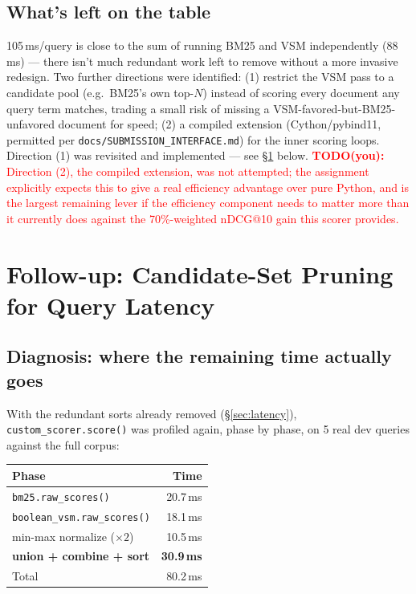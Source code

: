 \documentclass[11pt]{article}
\newcommand{\todo}[1]{\textcolor{red}{\textbf{TODO(you):} #1}}
\begin{document}
\subsection{What's left on the table}
105\,ms/query is close to the sum of running BM25 and VSM independently
(88\,ms) --- there isn't much redundant work left to remove without a
more invasive redesign. Two further directions were identified: (1)
restrict the VSM pass to a candidate pool (e.g.\ BM25's own top-$N$)
instead of scoring every document any query term matches, trading a
small risk of missing a VSM-favored-but-BM25-unfavored document for
speed; (2) a compiled extension (Cython/pybind11, permitted per
\texttt{docs/SUBMISSION\_INTERFACE.md}) for the inner scoring loops.
Direction (1) was revisited and implemented --- see \S\ref{sec:pruning}
below. \todo{Direction (2), the compiled extension, was not attempted;
the assignment explicitly expects this to give a real efficiency
advantage over pure Python, and is the largest remaining lever if the
efficiency component needs to matter more than it currently does against
the 70\%-weighted nDCG@10 gain this scorer provides.}

\section{Follow-up: Candidate-Set Pruning for Query Latency}
\label{sec:pruning}

\subsection{Diagnosis: where the remaining time actually goes}
With the redundant sorts already removed (\S\ref{sec:latency}),
\texttt{custom\_scorer.score()} was profiled again, phase by phase, on 5
real dev queries against the full corpus:

\begin{table}[h]
\centering
\begin{tabular}{lr}
\toprule
Phase & Time \\
\midrule
\texttt{bm25.raw\_scores()} & 20.7\,ms \\
\texttt{boolean\_vsm.raw\_scores()} & 18.1\,ms \\
min-max normalize ($\times 2$) & 10.5\,ms \\
\textbf{union + combine + sort} & \textbf{30.9\,ms} \\
\midrule
Total & 80.2\,ms \\
\bottomrule
\end{tabular}
\end{table}
\end{document}
